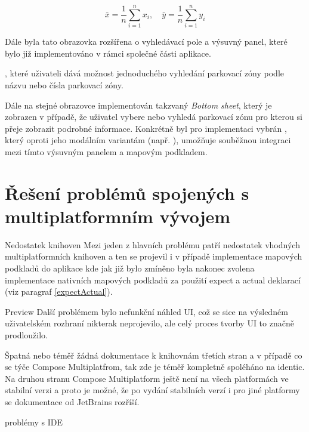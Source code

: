 \[
\bar{x} = \frac{1}{n} \sum_{i=1}^{n} x_i, \quad \bar{y} = \frac{1}{n} \sum_{i=1}^{n} y_i
\]

\bigskip

Dále byla tato obrazovka rozšířena o vyhledávací pole a výsuvný panel, které bylo již implementováno v rámci společné části aplikace. 

, které uživateli dává možnost jednoduchého vyhledání parkovací zóny podle názvu nebo
čísla parkovací zóny.

Dále na stejné obrazovce implementován takzvaný \textit{Bottom sheet}, který je zobrazen v případě, že uživatel vybere nebo vyhledá 
parkovací zónu pro kterou si přeje zobrazit podrobné informace. Konkrétně byl pro implementaci vybrán , který
oproti jeho modálním variantám (např. ), umožňuje souběžnou integraci mezi tímto výsuvným panelem a mapovým podkladem.


\section{Řešení problémů spojených s multiplatformním vývojem} %
Nedostatek knihoven
Mezi jeden z hlavních problému patří nedostatek vhodných multiplatformních knihoven a ten se projevil i v případě implementace mapových podkladů
do aplikace kde jak již bylo zmíněno byla nakonec zvolena implementace nativních mapových podkladů za použití expect a actual deklarací (viz paragraf \ref{expectActual}).

Preview
Další problémem bylo nefunkční náhled UI, což se sice na výsledném uživatelském rozhraní nikterak neprojevilo, ale celý proces tvorby UI to značně 
prodloužilo.

Špatná nebo téměř žádná dokumentace k knihovnám třetích stran a v případě co se týče Compose Multiplatfrom, tak zde je téměř kompletně spoléháno na
identic. 
Na druhou stranu Compose Multiplatform ještě není na všech platformách ve stabilní verzi a proto je možné, že po vydání stabilních verzí i pro jiné
platformy se dokumentace od JetBrains rozříší.

problémy s IDE 


